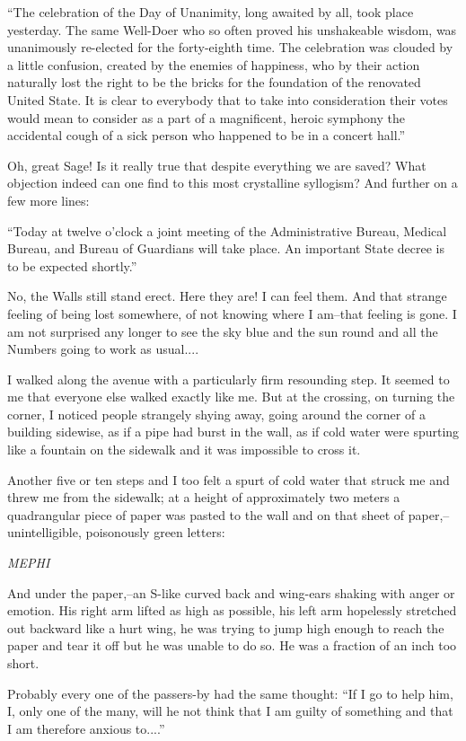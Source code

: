 \documentclass[11pt,openany]{book}
\begin{document}
``The celebration of the Day of Unanimity, long awaited by all, took place yesterday. The same Well-Doer who so often proved his unshakeable wisdom, was unanimously re-elected for the forty-eighth time. The celebration was clouded by a little confusion, created by the enemies of happiness, who by their action naturally lost the right to be the bricks for the foundation of the renovated United State. It is clear to everybody that to take into consideration their votes would mean to consider as a part of a magnificent, heroic symphony the accidental cough of a sick person who happened to be in a concert hall.''

Oh, great Sage! Is it really true that despite everything we are saved? What objection indeed can one find to this most crystalline syllogism? And further on a few more lines:

``Today at twelve o'clock a joint meeting of the Administrative Bureau, Medical Bureau, and Bureau of Guardians will take place. An important State decree is to be expected shortly.''

No, the Walls still stand erect. Here they are! I can feel them. And that strange feeling of being lost somewhere, of not knowing where I am--that feeling is gone. I am not surprised any longer to see the sky blue and the sun round and all the Numbers going to work as usual....

I walked along the avenue with a particularly firm resounding step. It seemed to me that everyone else walked exactly like me. But at the crossing, on turning the corner, I noticed people strangely shying away, going around the corner of a building sidewise, as if a pipe had burst in the wall, as if cold water were spurting like a fountain on the sidewalk and it was impossible to cross it.

Another five or ten steps and I too felt a spurt of cold water that struck me and threw me from the sidewalk; at a height of approximately two meters a quadrangular piece of paper was pasted to the wall and on that sheet of paper,--unintelligible, poisonously green letters:

\emph{MEPHI}

And under the paper,--an S-like curved back and wing-ears shaking with anger or emotion. His right arm lifted as high as possible, his left arm hopelessly stretched out backward like a hurt wing, he was trying to jump high enough to reach the paper and tear it off but he was unable to do so. He was a fraction of an inch too short.

Probably every one of the passers-by had the same thought: ``If I go to help him, I, only one of the many, will he not think that I am guilty of something and that I am therefore anxious to....''
\end{document}
